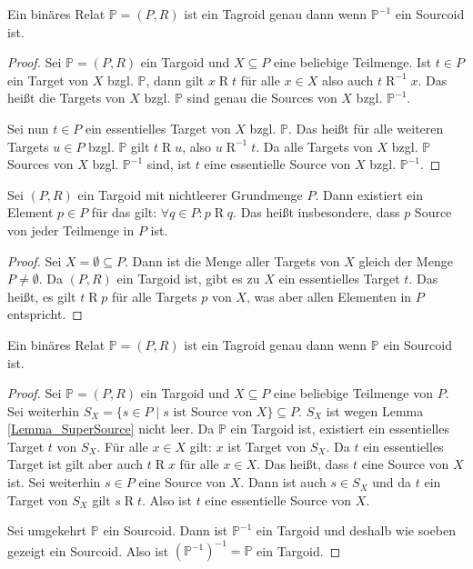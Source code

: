 \documentclass{article}
\begin{document}
\begin{theorem}
  Ein binäres Relat $\mathbb{P} = (P, R)$ ist ein Tagroid genau dann wenn
  $\mathbb{P}^{-1}$ ein Sourcoid ist.
\end{theorem}
\begin{proof}
  Sei $\mathbb{P} = (P, R)$ ein Targoid und $X \subseteq P$ eine beliebige Teilmenge.
  Ist $t \in P$ ein Target von $X$ bzgl. $\mathbb{P}$,
  dann gilt $x \mathrel{R} t$ für alle $x \in X$
  also auch $t \mathrel{R}^{-1} x$.
  Das heißt die Targets von $X$ bzgl. $\mathbb{P}$
  sind genau die Sources von $X$ bzgl. $\mathbb{P}^{-1}$.

  Sei nun $t \in P$ ein essentielles Target von $X$ bzgl. $\mathbb{P}$.
  Das heißt für alle weiteren Targets $u \in P$ bzgl. $\mathbb{P}$ gilt $t \mathrel{R} u$,
  also $u \mathrel{R}^{-1} t$.
  Da alle Targets von $X$ bzgl. $\mathbb{P}$ Sources von $X$ bzgl. $\mathbb{P}^{-1}$ sind,
  ist $t$ eine essentielle Source von $X$ bzgl. $\mathbb{P}^{-1}$.
\end{proof}

\begin{lemma}\label{Lemma_SuperSource}
  Sei $(P, R)$ ein Targoid mit nichtleerer Grundmenge $P$.
  Dann existiert ein Element $p \in P$ für das gilt: $\forall q \in P \colon p \mathrel{R} q$.
  Das heißt insbesondere, dass $p$ Source von jeder Teilmenge in $P$ ist.
\end{lemma}
\begin{proof}
  Sei $X = \emptyset \subseteq P$. Dann ist die Menge aller Targets von $X$ gleich der Menge $P \neq \emptyset$.
  Da $(P, R)$ ein Targoid ist, gibt es zu $X$ ein essentielles Target $t$.
  Das heißt, es gilt $t \mathrel{R} p$ für alle Targets $p$ von $X$, was aber allen Elementen in $P$ entspricht.
\end{proof}

\begin{theorem}\label{Theorem_TargoidEqualsSourcoid}
  Ein binäres Relat $\mathbb{P} = (P, R)$ ist ein Tagroid genau dann wenn
  $\mathbb{P}$ ein Sourcoid ist.
\end{theorem}
\begin{proof}
  Sei $\mathbb{P} = (P, R)$ ein Targoid und $X \subseteq P$ eine beliebige Teilmenge von $P$.
  Sei weiterhin $S_X = \{s \in P \mid s \text{ ist Source von } X\} \subseteq P$.
  $S_X$ ist wegen Lemma \ref{Lemma_SuperSource} nicht leer.
  Da $\mathbb{P}$ ein Targoid ist, existiert ein essentielles Target $t$ von $S_X$.
  Für alle $x \in X$ gilt: $x$ ist Target von $S_X$.
  Da $t$ ein essentielles Target ist gilt aber auch $t \mathrel{R} x$ für alle $x \in X$.
  Das heißt, dass $t$ eine Source von $X$ ist.
  Sei weiterhin $s \in P$ eine Source von $X$.
  Dann ist auch $s \in S_X$ und da $t$ ein Target von $S_X$ gilt $s \mathrel{R} t$.
  Also ist $t$ eine essentielle Source von $X$.

  Sei umgekehrt $\mathbb{P}$ ein Sourcoid.
  Dann ist $\mathbb{P}^{-1}$ ein Targoid und deshalb wie soeben gezeigt ein Sourcoid.
  Also ist $(\mathbb{P}^{-1})^{-1} = \mathbb{P}$ ein Targoid.
\end{proof}
\end{document}
